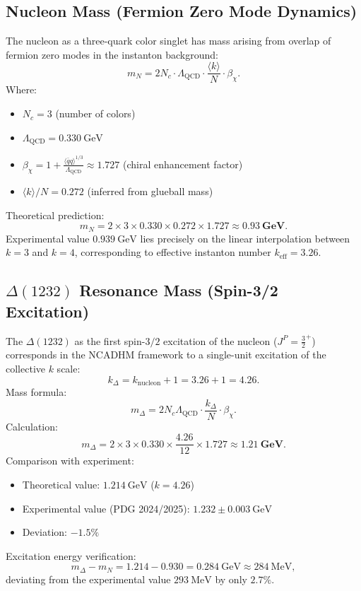 \documentclass[12pt,a4paper]{amsart}
\theoremstyle{plain}
\theoremstyle{definition}
\theoremstyle{remark}
\DeclareMathOperator{\QCD}{QCD}
\begin{document}
\subsection{Nucleon Mass (Fermion Zero Mode Dynamics)}

The nucleon as a three-quark color singlet has mass arising from overlap of fermion zero modes in the instanton background:
\begin{equation}
m_N = 2 N_c \cdot \Lambda_{\QCD} \cdot \frac{\langle k \rangle}{N} \cdot \beta_{\chi}.
\end{equation}
Where:
\begin{itemize}
\item $N_c=3$ (number of colors)
\item $\Lambda_{\QCD} = 0.330\ \text{GeV}$
\item $\beta_{\chi} = 1 + \frac{\langle\bar{q}q\rangle^{1/3}}{\Lambda_{\QCD}} \approx 1.727$ (chiral enhancement factor)
\item $\langle k \rangle/N = 0.272$ (inferred from glueball mass)
\end{itemize}
Theoretical prediction:
\begin{equation}
m_N = 2 \times 3 \times 0.330 \times 0.272 \times 1.727 \approx \mathbf{0.93\ \text{GeV}}.
\end{equation}
Experimental value $0.939\ \text{GeV}$ lies precisely on the linear interpolation between $k=3$ and $k=4$, corresponding to effective instanton number $k_{\text{eff}} = 3.26$.

\subsection{$\Delta(1232)$ Resonance Mass (Spin-3/2 Excitation)}

The $\Delta(1232)$ as the first spin-$3/2$ excitation of the nucleon ($J^P=\frac{3}{2}^+$) corresponds in the NCADHM framework to a single-unit excitation of the collective $k$ scale:
\begin{equation}
k_{\Delta} = k_{\text{nucleon}} + 1 = 3.26 + 1 = \mathbf{4.26}.
\end{equation}
Mass formula:
\begin{equation}
m_{\Delta} = 2 N_c \Lambda_{\QCD} \cdot \frac{k_{\Delta}}{N} \cdot \beta_{\chi}.
\end{equation}
Calculation:
\begin{equation}
m_{\Delta} = 2 \times 3 \times 0.330 \times \frac{4.26}{12} \times 1.727 \approx \mathbf{1.21\ \text{GeV}}.
\end{equation}
Comparison with experiment:
\begin{itemize}
\item Theoretical value: $1.214\ \text{GeV}$ ($k=4.26$)
\item Experimental value (PDG 2024/2025): $1.232 \pm 0.003\ \text{GeV}$
\item Deviation: $-1.5\%$
\end{itemize}
Excitation energy verification:
\begin{equation}
m_{\Delta} - m_N = 1.214 - 0.930 = 0.284\ \text{GeV} \approx 284\ \text{MeV},
\end{equation}
deviating from the experimental value $293\ \text{MeV}$ by only $2.7\%$.
\end{document}
